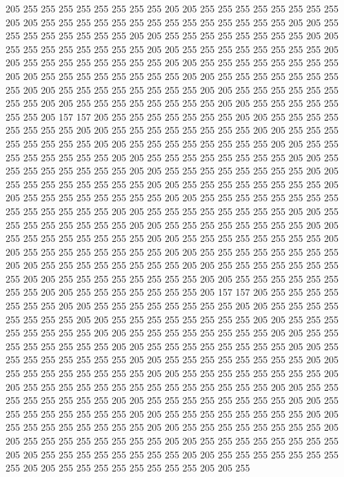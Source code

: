 205 255 255 255 255 255 255 255 255 205 205 255 255 255 255 255 255 255 255 205
205 255 255 255 255 255 255 255 255 255 255 255 255 255 255 205 205 255 255 255
255 255 255 255 255 205 205 255 255 255 255 255 255 255 255 205 205 255 255 255
255 255 255 255 255 205 205 255 255 255 255 255 255 255 255 205 205 255 255 255
255 255 255 255 255 205 205 255 255 255 255 255 255 255 255 205 205 255 255 255
255 255 255 255 255 205 205 255 255 255 255 255 255 255 255 205 205 255 255 255
255 255 255 255 255 205 205 255 255 255 255 255 255 255 255 205 205 255 255 255
255 255 255 255 255 205 205 255 255 255 255 255 255 255 205 157 157 205 255 255
255 255 255 255 255 205 205 255 255 255 255 255 255 255 255 205 205 255 255 255
255 255 255 255 255 205 205 255 255 255 255 255 255 255 255 205 205 255 255 255
255 255 255 255 255 205 205 255 255 255 255 255 255 255 255 205 205 255 255 255
255 255 255 255 255 205 205 255 255 255 255 255 255 255 255 205 205 255 255 255
255 255 255 255 255 205 205 255 255 255 255 255 255 255 255 205 205 255 255 255
255 255 255 255 255 205 205 255 255 255 255 255 255 255 255 205 205 255 255 255
255 255 255 255 255 255 255 255 255 255 255 205 205 255 255 255 255 255 255 255
255 205 205 255 255 255 255 255 255 255 255 205 205 255 255 255 255 255 255 255
255 205 205 255 255 255 255 255 255 255 255 205 205 255 255 255 255 255 255 255
255 205 205 255 255 255 255 255 255 255 255 205 205 255 255 255 255 255 255 255
255 205 205 255 255 255 255 255 255 255 255 205 205 255 255 255 255 255 255 255
255 205 205 255 255 255 255 255 255 255 255 205 205 255 255 255 255 255 255 255
255 205 205 255 255 255 255 255 255 255 205 157 157 205 255 255 255 255 255 255
255 205 205 255 255 255 255 255 255 255 255 205 205 255 255 255 255 255 255 255
255 205 205 255 255 255 255 255 255 255 255 205 205 255 255 255 255 255 255 255
255 205 205 255 255 255 255 255 255 255 255 205 205 255 255 255 255 255 255 255
255 205 205 255 255 255 255 255 255 255 255 205 205 255 255 255 255 255 255 255
255 205 205 255 255 255 255 255 255 255 255 205 205 255 255 255 255 255 255 255
255 205 205 255 255 255 255 255 255 255 255 205 205 255 255 255 255 255 255 255
255 255 255 255 255 255 255 205 205 255 255 255 255 255 255 255 255 205 205 255
255 255 255 255 255 255 255 205 205 255 255 255 255 255 255 255 255 205 205 255
255 255 255 255 255 255 255 205 205 255 255 255 255 255 255 255 255 205 205 255
255 255 255 255 255 255 255 205 205 255 255 255 255 255 255 255 255 205 205 255
255 255 255 255 255 255 255 205 205 255 255 255 255 255 255 255 255 205 205 255
255 255 255 255 255 255 255 205 205 255 255 255 255 255 255 255 255 205 205 255
